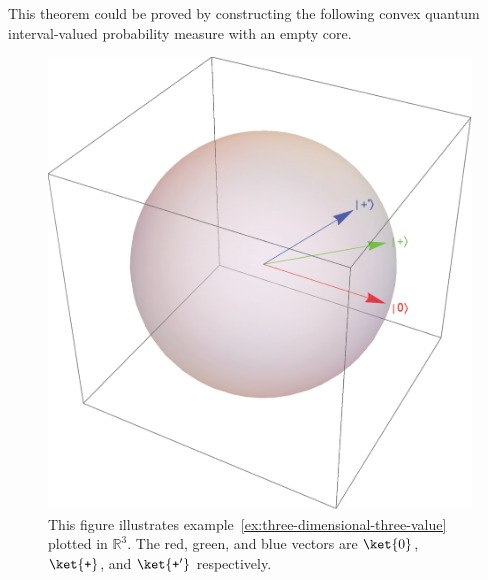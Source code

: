 \documentclass[12pt]{iopart}
\theoremstyle{plain}
\theoremstyle{definition}
\theoremstyle{remark}
\newcommand{\ps}{\texttt{+}}
\begin{document}
This theorem could be proved by constructing the following convex
quantum interval-valued probability measure with an empty core.
\begin{figure}
\begin{centering}
\includegraphics[scale=0.38]{figure2_1} 
\par\end{centering}
\caption{\label{fig:three-dimensional-3-value-2}This figure illustrates example~\ref{ex:three-dimensional-three-value}
plotted in $\mathbb{R}^{3}$. The red, green, and blue vectors are
$\ket{0}$, $\ket{\ps}$, and $\ket{\ps'}$ respectively. }
\end{figure}
\end{document}
